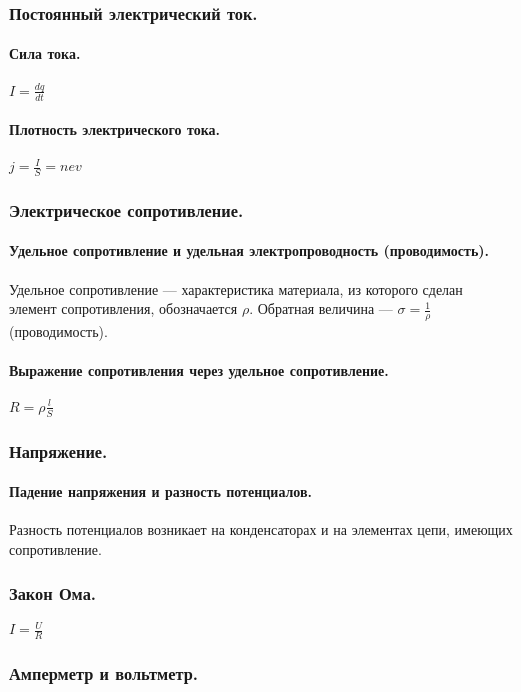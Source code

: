 \documentclass{article}
\begin{document}
        \subsubsection{Постоянный электрический ток.}
            \paragraph{Сила тока.}
                \(I = \frac{dq}{dt}\)
            \paragraph{Плотность электрического тока.}
                \(j = \frac{I}{S} = nev\)
        \subsubsection{Электрическое сопротивление.}
            \paragraph{Удельное сопротивление и удельная электропроводность (проводимость).}
                Удельное сопротивление --- характеристика материала, из которого сделан элемент сопротивления, обозначается \(\rho\). Обратная величина --- \(\sigma = \frac{1}{\rho}\)(проводимость).
                
            \paragraph{Выражение сопротивления через удельное сопротивление.}
                \(R = \rho\frac{l}{S}\)
        \subsubsection{Напряжение.}
            \paragraph{Падение напряжения и разность потенциалов.}
                Разность потенциалов возникает на конденсаторах и на элементах цепи, имеющих сопротивление.
        \subsubsection{Закон Ома.}
                \(I = \frac{U}{R}\)
        \subsubsection{Амперметр и вольтметр.}
\end{document}
